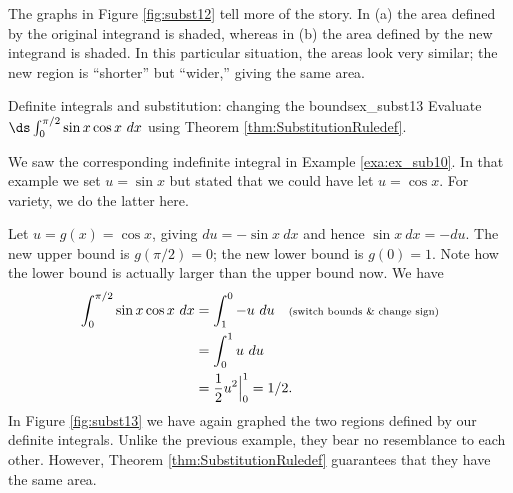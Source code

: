 \begin{solution}
{The graphs in Figure \ref{fig:subst12} tell more of the story. In (a) the area defined by the original integrand is shaded, whereas in (b) the area defined by the new integrand is shaded. In this particular situation, the areas look very similar; the new region is ``shorter'' but ``wider,'' giving the same area.
}\\
\end{solution}


\begin{example}{Definite integrals and substitution: changing the bounds}{ex_subst13}
{
Evaluate $\ds \int_0^{\pi/2} \sin x \cos x\ dx$ using Theorem \ref{thm:SubstitutionRuledef}.
}
\end{example}

\begin{solution}
{We saw the corresponding indefinite integral in Example \ref{exa:ex_sub10}. In that example we set $u = \sin x$ but stated that we could have let $u = \cos x$. For variety, we do the latter here.

Let $u = g(x) = \cos x$, giving $du = -\sin x\ dx$ and hence $\sin x\ dx = -du$. The new upper bound is $g(\pi/2) = 0$; the new lower bound is $g(0) = 1$. Note how the lower bound is actually larger than the upper bound now. We have
\begin{align*}
	\int_0^{\pi/2} \sin x\cos x\ dx &= \int_1^0 -u\ du \quad \text{\scriptsize (switch bounds \& change sign)}\\%
											&=	\int_0^1 u\ du\\
											&= \frac12u^2\Big|_0^1= 1/2.%
\end{align*}
In Figure \ref{fig:subst13} we have again graphed the two regions defined by our definite integrals. Unlike the previous example, they bear no resemblance to each other. However, Theorem \ref{thm:SubstitutionRuledef} guarantees that they have the same area.


}
\end{solution}
